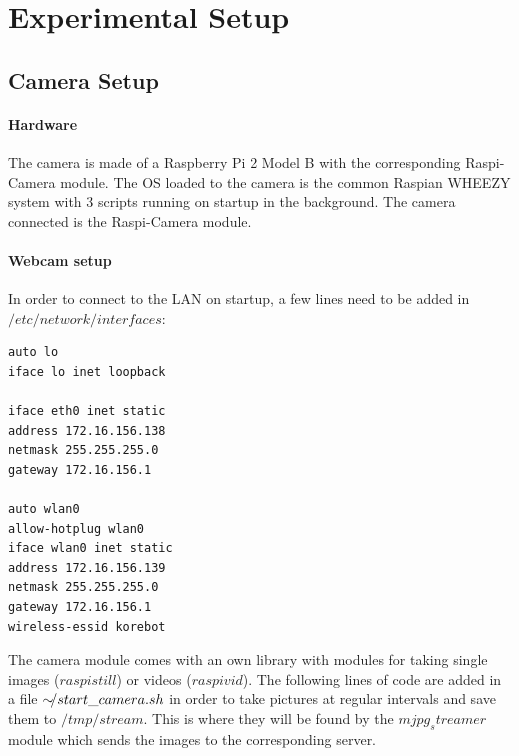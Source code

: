 \newpage
\section{Experimental Setup}

\subsection{Camera Setup}

\paragraph{Hardware} The camera is made of a Raspberry Pi 2 Model B with the corresponding Raspi-Camera module. The OS loaded to the camera is the common Raspian WHEEZY system with 3 scripts running on startup in the background. The camera connected is the Raspi-Camera module.

\paragraph{Webcam setup} In order to connect to the LAN on startup, a few lines need to be added in $/etc/network/interfaces$: 

\begin{center}
\begin{minipage}{0.9\linewidth}
\begin{lstlisting}[caption=$/etc/network/interfaces$, label=interfaces, frame=none]
auto lo
iface lo inet loopback

iface eth0 inet static
address 172.16.156.138
netmask 255.255.255.0
gateway 172.16.156.1

auto wlan0
allow-hotplug wlan0
iface wlan0 inet static
address 172.16.156.139
netmask 255.255.255.0
gateway 172.16.156.1
wireless-essid korebot
\end{lstlisting}
\end{minipage}
\end{center}

The camera module comes with an own library with modules for taking single images ($raspistill$) or videos ($raspivid$).
The following lines of code are added in a file $\sim\hspace{-0.5em}/start\_camera.sh$ in order to take pictures at regular intervals and save them to $/tmp/stream$. This is where they will be found by the $mjpg_streamer$ module which sends the images to the corresponding server.


